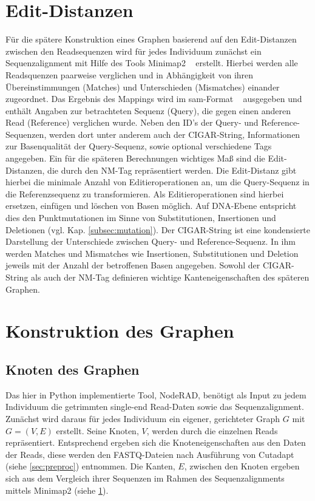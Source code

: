 \section{Edit-Distanzen} \label{sec:edit}
Für die spätere Konstruktion eines Graphen basierend auf den Edit-Distanzen zwischen den Readsequenzen wird für jedes Individuum zunächst ein Sequenzalignment mit Hilfe des Tools Minimap2 ~\cite{li_2018} erstellt. Hierbei werden alle Readsquenzen paarweise verglichen und in Abhängigkeit von ihren Übereinstimmungen (Matches) und Unterschieden (Mismatches) einander zugeordnet. Das Ergebnis des Mappings wird im sam-Format ~\cite{li_2009} ausgegeben und enthält Angaben zur betrachteten Sequenz (Query), die gegen einen anderen Read (Reference) verglichen wurde. Neben den ID's der Query- und Reference-Sequenzen, werden dort unter anderem auch der CIGAR-String, Informationen zur Basenqualität der Query-Sequenz, sowie optional verschiedene Tags angegeben. Ein für die späteren Berechnungen wichtiges Maß sind die Edit-Distanzen, die durch den NM-Tag repräsentiert werden. Die Edit-Distanz gibt hierbei die minimale Anzahl von Editieroperationen an, um die Query-Sequenz in die Referenzsequenz zu transformieren. Als Editieroperationen sind hierbei ersetzen, einfügen und löschen von Basen möglich. Auf DNA-Ebene entspricht dies den Punktmutationen im Sinne von Substitutionen, Insertionen und Deletionen (vgl. Kap. \ref{subsec:mutation}). Der CIGAR-String ist eine kondensierte Darstellung der Unterschiede zwischen Query- und Reference-Sequenz. In ihm werden Matches und Mismatches wie Insertionen, Substitutionen und Deletion jeweils mit der Anzahl der betroffenen Basen angegeben. Sowohl der CIGAR-String als auch der NM-Tag definieren wichtige Kanteneigenschaften des späteren Graphen. \\

\section{Konstruktion des Graphen} \label{sec:graph}
\subsection{Knoten des Graphen}
Das hier in Python implementierte Tool, NodeRAD, benötigt als Input zu jedem Individuum die getrimmten single-end Read-Daten sowie das Sequenzalignment. Zunächst wird daraus für jedes Individuum ein eigener, gerichteter Graph $ G $ mit $ G = (V,E) $ erstellt. Seine Knoten, $ V $, werden durch die einzelnen Reads repräsentiert. Entsprechend ergeben sich die Knoteneigenschaften aus den Daten der Reads, diese werden den FASTQ-Dateien nach Ausführung von Cutadapt (siehe \ref{sec:preproc}) entnommen. Die Kanten, $ E $, zwischen den Knoten ergeben sich aus dem Vergleich ihrer Sequenzen im Rahmen des Sequenzalignments mittels Minimap2 (siehe \ref{sec:edit}).\\

